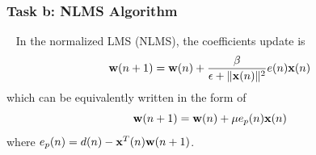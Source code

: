 \documentclass[10pt]{article}
\begin{document}

\subsubsection{Task b: NLMS Algorithm}
\ \indent
In the normalized LMS (NLMS), the coefficients update is 
\begin{equation}
	{\bf{w}}(n+1) = {\bf{w}}(n) + \frac{\beta}{\epsilon + \Vert {\bf{x}}(n) \Vert ^2} e(n) {\bf{x}}(n) \label{eq41}
\end{equation}
which can be equivalently written in the form of 
\begin{equation}
	{\bf{w}}(n+1) = {\bf{w}}(n) + \mu e_p(n) {\bf{x}}(n) \label{eq42}
\end{equation}
where $e_p(n) = d(n) - {\bf{x}}^T(n) {\bf{w}}(n+1)$.
\end{document}

